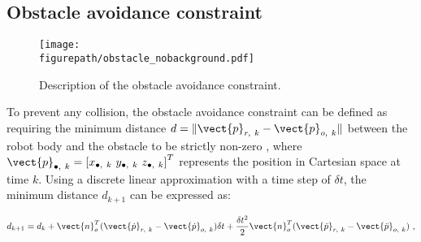 \subsection{Obstacle avoidance constraint}
\label{sec:motion obstacle constraint}
\begin{figure}[!h]
\centering
\texttt{[image: \\figurepath/obstacle\_nobackground.pdf]}
\caption{Description of the obstacle avoidance constraint.}
\label{fig:obstacle}
\end{figure}
To prevent any collision, the obstacle avoidance constraint can be defined as requiring the minimum distance $d=\| \vect{p}_{r,~k}-\vect{p}_{o,~k}\|$ between the robot body and the obstacle to be strictly non-zero \cite{faverjon1987, kanehiro2008}, where $\vect{p}_{\bullet,~k}=\left[x_{\bullet,~k}~y_{\bullet,~k}~z_{\bullet,~k}\right]^T$ represents the position in Cartesian space at time $k$. Using a discrete linear approximation with a time step of $\delta t$, the minimum distance $d_{k+1}$ can be expressed as:
\begin{singlespace}
\begin{equation}\label{eq:obstacle constraint original}
d_{k+1} = d_{k} + \vect{n}_o^T(\vect{\dot{p}}_{r,~k}-\vect{\dot{p}}_{o,~k})\delta t + \frac{\delta t^2}{2}\vect{n}_o^T (\vect{\ddot{p}}_{r,~k}-\vect{\ddot{p}}_{o,~k}) ~,
\end{equation}
\end{singlespace}

